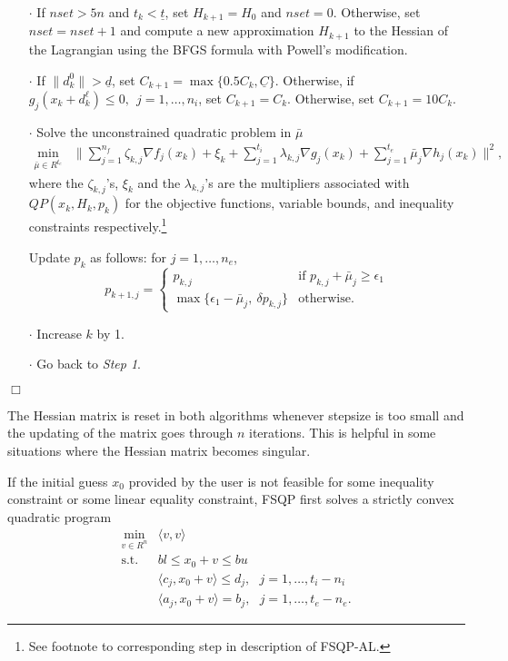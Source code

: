 \begin{itemize}
\item[$\cdot$] If $nset>5n$ and $t_k<\underline t$, set $H_{k+1}=H_0$
and $nset=0$. Otherwise, set $nset=nset+1$ and 
compute a new approximation $H_{k+1}$ 
to the Hessian of the Lagrangian using the BFGS formula with Powell's 
modification\Rcitemark . 
\item[$\cdot$] If $\|d^0_k\|>\underline{d}$, 
set $C_{k+1}=\max \{0.5C_k,\underline{C}\}.$
Otherwise, if $g_j(x_k+d_k^\ell) \leq 0,~~j=1,\ldots,n_i$, 
set $C_{k+1}=C_k$. Otherwise, set $C_{k+1}=10C_k$.
\item[$\cdot$] Solve the unconstrained 
quadratic problem in $\bar{\mu}$
$$\begin{array}{cl}
\min\limits_{\bar{\mu}\in R^{t_e}} &
\|\sum\limits_{j=1}^{n_f}\zeta _{k,j}\nabla f_j(x_k)+
\xi_k+\sum\limits_{j=1}^{t_i}\lambda_{k,j}\nabla g_j(x_k)
  +\sum\limits_{j=1}^{t_e}\bar{\mu}_j\nabla h_j(x_k)\|^2,
\end{array}$$
where the $\zeta_{k,j}$'s, $\xi_k$ and the $\lambda_{k,j}$'s
are the multipliers associated with $QP(x_k,H_k,p_k)$ for the objective
functions, variable bounds, and inequality constraints 
respectively.\footnote{See footnote to corresponding step in description
of FSQP-AL.} 

Update $p_k$ as follows: for $j=1,\ldots,n_e$,
$$p_{k+1,j}=\left\{\begin{array}{ll}
p_{k,j} & \mbox{if } p_{k,j}+\bar\mu_j \geq \epsilon_1\\
\max\{\epsilon_1-\bar\mu_j,~\delta p_{k,j}\} & \mbox{otherwise.}
\end{array}\right.$$
\item[$\cdot$] Increase $k$ by 1.
\item[$\cdot$] Go back to {\it Step 1}.
\end{itemize}

\hfill{\large \bf $\Box$}

 The Hessian matrix is reset
in both algorithms whenever stepsize is too small and
the updating of the matrix goes through $n$ iterations.
This is helpful in some situations where the Hessian matrix
becomes singular.
 
\vspace{1em}
If the initial guess $x_0$ provided by the user is not feasible
for some inequality constraint or some linear equality constraint,
FSQP first solves a strictly convex quadratic program
\smallskip
$$\begin{array}{cl}
           \min\limits_{v\in R^n} &  \langle v,v\rangle \\
            \mbox{s.t.} &   bl \leq x_0+v \leq bu\\
                  &   \langle c_j,x_0 + v \rangle \leq d_j,
                        ~~~j=1,\ldots,t_i-n_i\\
                  &   \langle a_j,x_0 + v \rangle=b_j,
                      ~~~j=1,\ldots,t_e-n_e.  \end{array}$$


